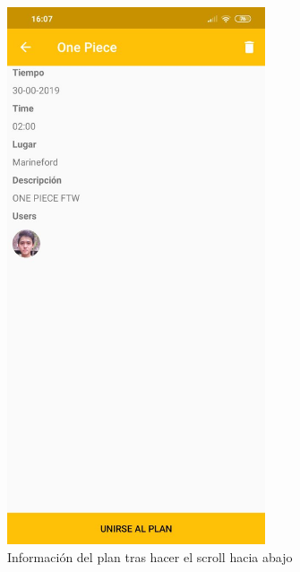 \begin{figure}[H]
    \centering
    \includegraphics[width=3in]{figures/infoPlan2.jpg}
    \caption{Información del plan tras hacer el scroll hacia abajo}
\end{figure}